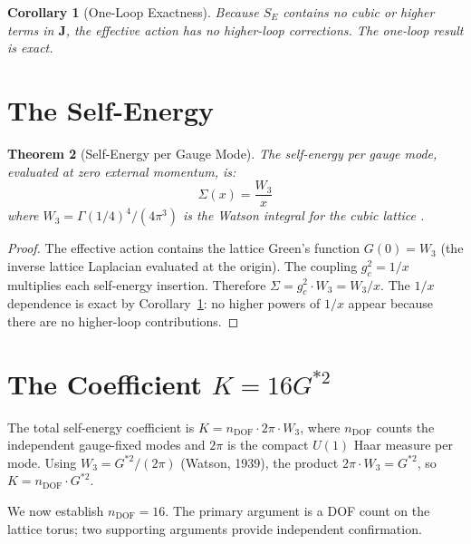 \documentclass[12pt]{article}
\newtheorem{theorem}{Theorem}[section]
\newtheorem{corollary}[theorem]{Corollary}
\theoremstyle{definition}
\theoremstyle{remark}
\begin{document}
\begin{corollary}[One-Loop Exactness]
\label{cor:one-loop}
Because $S_E$ contains no cubic or higher terms in $\mathbf{J}$, the effective action has \emph{no higher-loop corrections}. The one-loop result is exact.
\end{corollary}

\section{The Self-Energy}
\label{sec:self-energy}

\begin{theorem}[Self-Energy per Gauge Mode]
\label{thm:self-energy}
The self-energy per gauge mode, evaluated at zero external momentum, is:
\begin{equation}
    \Sigma(x) = \frac{W_3}{x}
    \label{eq:sigma}
\end{equation}
where $W_3 = \Gamma(1/4)^4/(4\pi^3)$ is the Watson integral for the cubic lattice \cite{watson1939, paper1a}.
\end{theorem}

\begin{proof}
The effective action contains the lattice Green's function $G(0) = W_3$ (the inverse lattice Laplacian evaluated at the origin). The coupling $g_c^2 = 1/x$ multiplies each self-energy insertion. Therefore $\Sigma = g_c^2 \cdot W_3 = W_3/x$. The $1/x$ dependence is exact by Corollary~\ref{cor:one-loop}: no higher powers of $1/x$ appear because there are no higher-loop contributions.
\end{proof}

\section{The Coefficient $K = 16G^{*2}$}
\label{sec:coefficient}

The total self-energy coefficient is $K = n_{\mathrm{DOF}} \cdot 2\pi \cdot W_3$, where $n_{\mathrm{DOF}}$ counts the independent gauge-fixed modes and $2\pi$ is the compact $U(1)$ Haar measure per mode. Using $W_3 = G^{*2}/(2\pi)$ (Watson, 1939), the product $2\pi \cdot W_3 = G^{*2}$, so $K = n_{\mathrm{DOF}} \cdot G^{*2}$.

We now establish $n_{\mathrm{DOF}} = 16$. The primary argument is a DOF count on the lattice torus; two supporting arguments provide independent confirmation.
\end{document}
